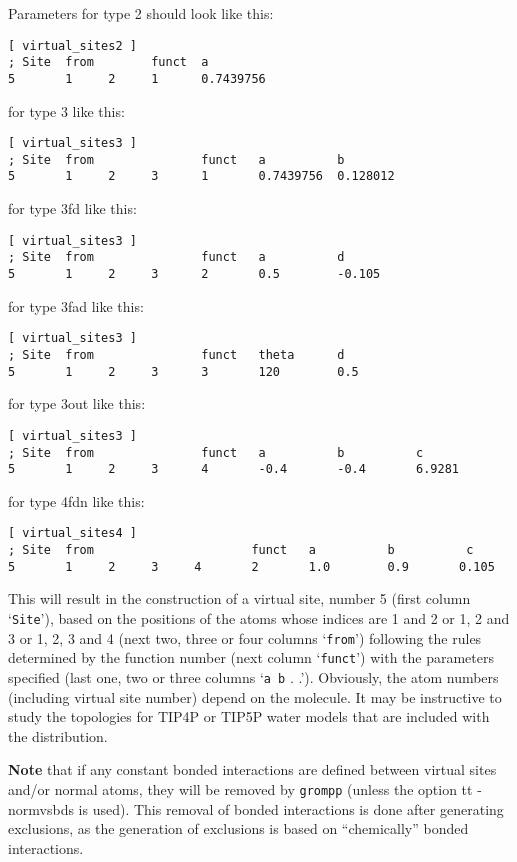 Parameters for type 2 should look like this:
{\small
\begin{verbatim}
[ virtual_sites2 ]
; Site  from        funct  a
5       1     2     1      0.7439756
\end{verbatim}}

for type 3 like this:
{\small
\begin{verbatim}
[ virtual_sites3 ]
; Site  from               funct   a          b
5       1     2     3      1       0.7439756  0.128012
\end{verbatim}}

for type 3fd like this:
{\small
\begin{verbatim}
[ virtual_sites3 ]
; Site  from               funct   a          d
5       1     2     3      2       0.5        -0.105
\end{verbatim}}

for type 3fad like this:
{\small
\begin{verbatim}
[ virtual_sites3 ]
; Site  from               funct   theta      d
5       1     2     3      3       120        0.5
\end{verbatim}}

for type 3out like this:
{\small
\begin{verbatim}
[ virtual_sites3 ]
; Site  from               funct   a          b          c
5       1     2     3      4       -0.4       -0.4       6.9281
\end{verbatim}}

for type 4fdn like this:
{\small
\begin{verbatim}
[ virtual_sites4 ]
; Site  from                      funct   a          b          c
5       1     2     3     4       2       1.0        0.9       0.105
\end{verbatim}}

This will result in the construction of a virtual site, number 5
(first column `{\tt Site}'), based on the positions of the atoms
whose indices are 1 and 2 or 1, 2 and 3 or 1, 2, 3 and 4 (next two,
three or four columns `{\tt from}') following the rules determined by the function number
(next column `{\tt funct}') with the parameters specified (last one,
two or three columns `{\tt a b} . .'). Obviously, the atom numbers
(including virtual site number) depend
on the molecule. It may be instructive to study the topologies for
TIP4P or TIP5P water models that are included with the {\gromacs} distribution.

{\bf Note} that if any constant bonded interactions are defined between
virtual sites and/or normal atoms, they will be removed by {\tt grompp}
(unless the option {tt -normvsbds} is used).
This removal of bonded interactions is done after generating exclusions,
as the generation of exclusions is based on ``chemically'' bonded interactions.

